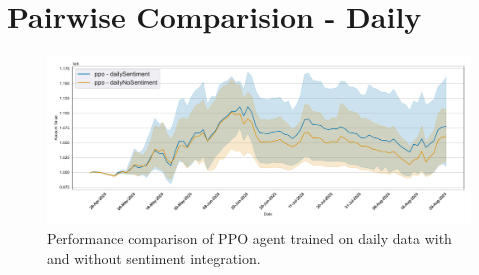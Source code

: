 \documentclass[12pt]{article}
\begin{document}










\appendix
\section{Pairwise Comparision - Daily}

\begin{figure}[h]
\centering
\includegraphics[width=1\textwidth]{figs/Models_comparison/Sentiment/Compare_agent_performance_dailySentiment_ppo.pdf}
\caption{Performance comparison of PPO agent trained on daily data with and without sentiment integration.}
\label{fig:Compare_agent_performance_dailySentiment_ppo}
\end{figure}
\end{document}

